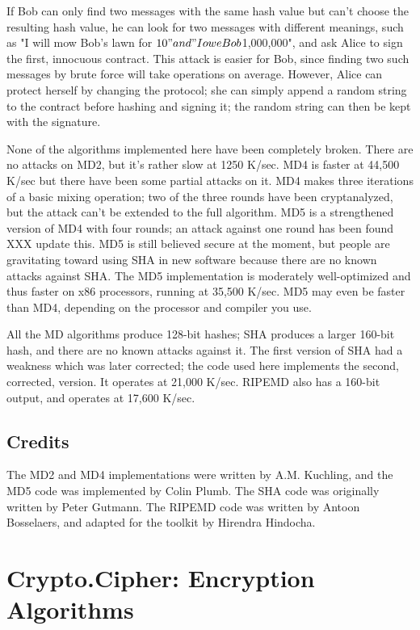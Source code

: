 \documentclass{howto}
\begin{document}
If Bob can only find two messages with the same hash value but can't
choose the resulting hash value, he can look for two messages with
different meanings, such as "I will mow Bob's lawn for $10" and "I owe
Bob $1,000,000", and ask Alice to sign the first, innocuous contract.
This attack is easier for Bob, since finding two such messages by brute
force will take  operations on average.  However,
Alice can protect herself by changing the protocol; she can simply
append a random string to the contract before hashing and signing it;
the random string can then be kept with the signature.

None of the algorithms implemented here have been completely broken.
There are no attacks on MD2, but it's rather slow at 1250 K/sec.  MD4
is faster at 44,500 K/sec but there have been some partial attacks on
it.  MD4 makes three iterations of a basic mixing operation; two of
the three rounds have been cryptanalyzed, but the attack can't be
extended to the full algorithm.  MD5 is a strengthened version of MD4
with four rounds; an attack against one round has been found XXX
update this.  MD5 is still believed secure at the moment, but people
are gravitating toward using SHA in new software because there are no
known attacks against SHA.  The MD5 implementation is moderately
well-optimized and thus faster on x86 processors, running at 35,500
K/sec.  MD5 may even be faster than MD4, depending on the processor
and compiler you use.

All the MD algorithms produce 128-bit hashes; SHA produces a
larger 160-bit hash, and there are no known attacks against it.  The
first version of SHA had a weakness which was later corrected; the
code used here implements the second, corrected, version.  It operates
at 21,000 K/sec.  RIPEMD also has a 160-bit output, and operates at
17,600 K/sec.

\subsection{Credits}
The MD2 and  MD4 implementations were written by A.M. Kuchling,
and the MD5 code was implemented by Colin Plumb.  The SHA code was
originally written by Peter Gutmann.  The RIPEMD code was written by
Antoon Bosselaers, and adapted for the toolkit by Hirendra Hindocha.


\section{Crypto.Cipher: Encryption Algorithms}
\end{document}
